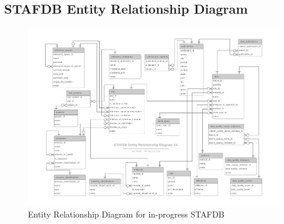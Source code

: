 \documentclass[ %
                    author={Tom Jager},
                supervisor={Dr. Daniel Schien},
                    degree={MEng},
                     title={A Bayesian Inference Engine for Calibrating Uncertainty over UMIS Structured MFA Systems},
                  subtitle={},
                      type={research},
                      year={2019} ]{dissertation}
\begin{document}
\backmatter





\appendix
\chapter{}
\label{appx:example}

\section{STAFDB Entity Relationship Diagram}
\label{appx:stafdb_erd}
\begin{figure}[h!]
    \centering
    \includegraphics[width=\textwidth]{images/STAF_ERD_V4.pdf}
    \caption{Entity Relationship Diagram for in-progress STAFDB}
    \label{fig:stafdb_erd}
\end{figure}
\end{document}
